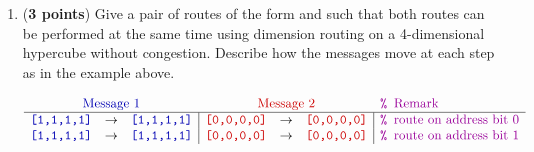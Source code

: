 \documentclass{article}
\newenvironment{answer}
{\color{blue}}
{\normalfont}
\newcounter{enumiisave}
\begin{document}
\begin{enumerate}
          \begin{enumerate}\setcounter{enumii}{\value{enumiisave}}
              \item (\textbf{3 points})\setcounter{enumiisave}{\value{enumii}}
                    Give a pair of routes of the form  and
                     such that both routes can be performed at the
                    same time using dimension routing on a 4-dimensional hypercube without congestion.
                    Describe how the messages move at each step as in the example above.
                    \begin{answer}
                        \begin{displaymath}\begin{array}{rcl|rcl|l}
                                \multicolumn{3}{c}{\color{CodeColor}\textrm{Message 1}} &
                                \multicolumn{3}{c}{\color{MediumRed}\textrm{Message 2}} &
                                \code{\xcomment{Remark}}                                                                                    \\\hline
                                \code{[1,1,1,1]}                                        & \rightarrow & \code{[1,1,1,1]}                  &
                                \code{\color{MediumRed}[0,0,0,0]}                       & \rightarrow & \code{\color{MediumRed}[0,0,0,0]} &
                                \code{\xcomment{route on address bit 0}}                                                                    \\
                                \code{[1,1,1,1]}                                        & \rightarrow & \code{[1,1,1,1]}                  &
                                \code{\color{MediumRed}[0,0,0,0]}                       & \rightarrow & \code{\color{MediumRed}[0,0,0,0]} &
                                \code{\xcomment{route on address bit 1}}                                                                    \\

\end{array}
\end{displaymath}
\end{answer}
\end{enumerate}
\end{enumerate}
\end{document}
